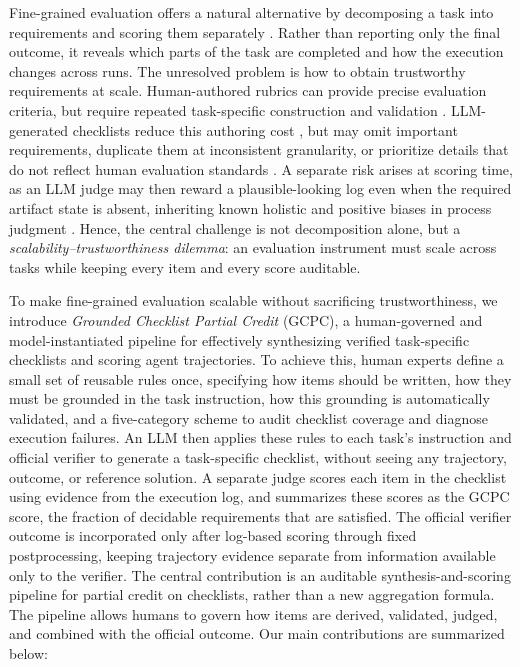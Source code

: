 \documentclass[sigconf,nonacm]{acmart}
\begin{document}
Fine-grained evaluation offers a natural alternative by decomposing a task into
requirements and scoring them separately
\citep{ma2024agentboard,odysseys2026,agentprocessbench2026}. Rather than reporting only the final outcome, it reveals which parts of the task are completed and how the execution changes across runs. The unresolved
problem is how to obtain trustworthy requirements at scale. Human-authored
rubrics can provide precise evaluation criteria, but require repeated task-specific construction and
validation \citep{odysseys2026}. LLM-generated checklists reduce this authoring
cost \citep{cook2024tick,wei2025rocketeval,zhou2026autochecklist}, but may omit important
requirements, duplicate them at inconsistent granularity, or prioritize
details that do not reflect human evaluation standards
\citep{zhang2026rubricbench}. A separate risk arises at scoring time, as an LLM judge may then reward a plausible-looking log even when the required artifact state is absent, inheriting known
holistic and positive biases in process judgment
\citep{agentprocessbench2026,zhang2026rubricbench,zheng2023mtbench,ye2024justice,siro2026learning}. Hence, the central challenge is not decomposition alone, but a \emph{scalability--trustworthiness dilemma}: an evaluation instrument must scale across tasks while keeping every item and every score auditable.

To make fine-grained evaluation scalable without sacrificing trustworthiness, we introduce \emph{Grounded Checklist Partial Credit} (GCPC), a human-governed and
model-instantiated pipeline for effectively synthesizing verified task-specific checklists and scoring agent trajectories. To achieve this, human experts define a small set of reusable rules once, specifying how items should be written, how they must be grounded in the task instruction, how this grounding is automatically validated, and a five-category scheme to audit checklist coverage and diagnose execution failures. An LLM then applies these rules to each task's instruction and official verifier \citep{yao2025taubench,li2026skillsbench} to generate a task-specific checklist, without seeing any trajectory, outcome, or reference solution. A separate judge scores each item in the checklist using evidence from the execution log, and summarizes these scores as the GCPC score, the fraction of decidable requirements that are satisfied. The official verifier outcome is incorporated only after log-based scoring through fixed postprocessing, keeping trajectory evidence separate from information available only to the verifier. The central contribution is an auditable synthesis-and-scoring pipeline for partial credit on checklists, rather than a new aggregation formula. The pipeline allows humans to govern how items are derived, validated, judged, and combined with the official outcome. Our main contributions are summarized below:
\end{document}
